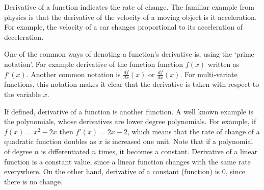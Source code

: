 Derivative of a function indicates the rate of change.
The familiar example from physics is that
the derivative of the velocity of a moving object is it acceleration.
For example,
the velocity of a car changes proportional to its acceleration of deceleration.

One of the common ways of denoting a function's derivative is,
using the `prime notation'.
For example derivative of the function function $f(x)$ written as $f'(x)$.
Another common notation is $\frac{df}{dx}(x)$ or $\frac{df}{dx}(x)$.
For multi-variate functions,
this notation makes it clear that the derivative is taken with respect to the variable $x$.

If defined, derivative of a function is another function.
A well known example is the polynomials,
whose derivatives are lower degree polynomials.
For example, if $f(x) = x^{2} - 2 x $ then $f'(x) = 2 x - 2$,
which means that the rate of change of a quadratic function doubles
as $x$ is increased one unit.
Note that if a polynomial of degree $n$ is differentiated $n$ times,
it becomes a constant.
Derivative of a linear function is a constant value,
since a linear function changes with the same rate everywhere.
On the other hand, derivative of a constant (function) is $0$,
since there is no change.

